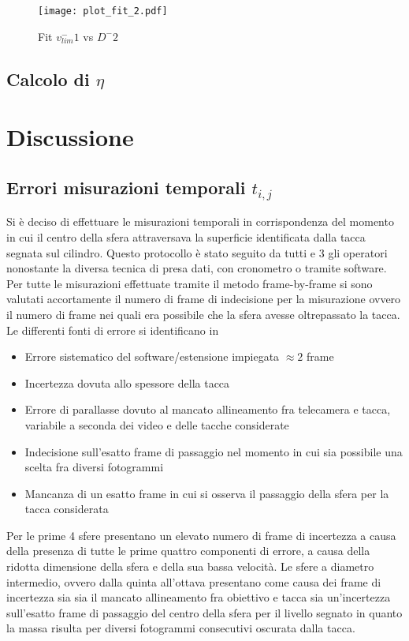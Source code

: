 \documentclass[a4paper,11pt,oneside]{article}
\begin{document}
\begin{figure}
    \centering
    \texttt{[image: plot\_fit\_2.pdf]}
    \caption{Fit $v_{lim}^-1$ vs $D^-2$}
    \label{fig:verifica_legge_2}
\end{figure}



\subsection{Calcolo di $\eta$}






\section{Discussione}
\subsection{Errori misurazioni temporali $t_{i,j}$}
Si è deciso di effettuare le misurazioni temporali in corrispondenza del momento in cui il centro della sfera attraversava la superficie identificata dalla tacca segnata sul cilindro. Questo protocollo è stato seguito da tutti e 3 gli operatori nonostante la diversa tecnica di presa dati, con cronometro o tramite software.
Per tutte le misurazioni effettuate tramite il metodo frame-by-frame si sono valutati accortamente il numero di frame di indecisione per la misurazione ovvero il numero di frame nei quali era possibile che la sfera avesse oltrepassato la tacca.
Le differenti fonti di errore si identificano in
\begin{itemize}
    \item Errore sistematico del software/estensione impiegata $\approx 2 $ frame
    \item Incertezza dovuta allo spessore della tacca
    \item Errore di parallasse dovuto al mancato allineamento fra telecamera e tacca, variabile a seconda dei video e delle tacche considerate
    \item Indecisione sull'esatto frame di passaggio nel momento in cui sia possibile una scelta fra diversi fotogrammi
    \item Mancanza di un esatto frame in cui si osserva il passaggio della sfera per la tacca considerata
\end{itemize}
Per le prime 4 sfere presentano un elevato numero di frame di incertezza a causa della presenza di tutte le prime quattro componenti di errore, a causa della ridotta dimensione della sfera e della sua bassa velocità.
Le sfere a diametro intermedio, ovvero dalla quinta all'ottava presentano come causa dei frame di incertezza sia sia il mancato allineamento fra obiettivo e tacca sia un'incertezza sull'esatto frame di passaggio del centro della sfera per il livello segnato in quanto la massa risulta per diversi fotogrammi consecutivi oscurata dalla tacca.
\end{document}
